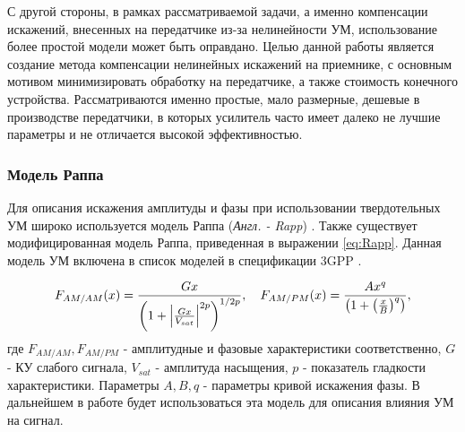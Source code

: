 С другой стороны, в рамках рассматриваемой задачи, а именно компенсации
искажений, внесенных на передатчике из-за нелинейности УМ, использование
более простой модели может быть оправдано. Целью данной работы является
создание метода компенсации нелинейных искажений на приемнике, с основным
мотивом минимизировать обработку на передатчике, а также стоимость
конечного устройства. Рассматриваются именно простые, мало размерные,
дешевые в производстве передатчики, в которых усилитель часто имеет далеко
не лучшие параметры и не отличается высокой эффективностью.

\subsubsection{Модель Раппа}
Для описания искажения амплитуды и фазы при использовании твердотельных УМ
широко используется модель Раппа (\textit{Англ. - Rapp}) \cite{Rapp1991}.
Также существует модифицированная модель Раппа, приведенная в выражении
\ref{eq:Rapp}. Данная модель УМ включена в список моделей в спецификации
3GPP \cite{3gpp.38.803}.

\begin{equation}
    F_{AM/AM}(x) = \frac{G x}{\left( 1 + \abs{\frac{Gx}{V_{sat}}}^{2p}\right)^{1/2p}},
    \quad 
    F_{AM/PM}(x) = \frac{Ax^q}{\left(1+\left(\frac{x}{B}\right)^q\right)},
    \label{eq:Rapp}
\end{equation}
где $F_{AM/AM}, F_{AM/PM}$ - амплитудные и фазовые характеристики
соответственно, $G$ - КУ слабого сигнала, $V_{sat}$ - амплитуда насыщения,
$p$ - показатель гладкости характеристики. Параметры $A,B,q$ - параметры
кривой искажения фазы. В дальнейшем в работе будет использоваться эта
модель для описания влияния УМ на сигнал.

